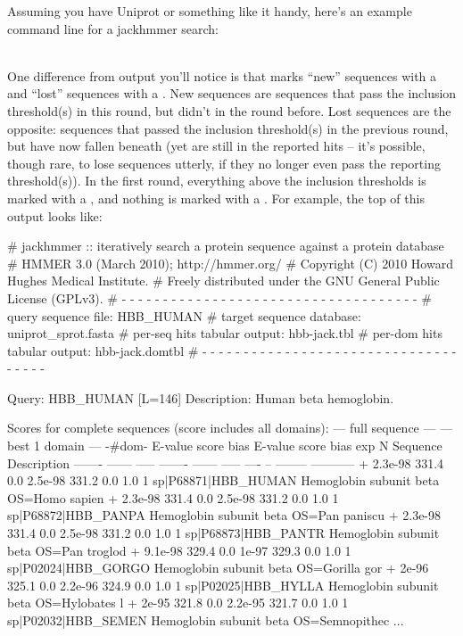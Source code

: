 Assuming you have Uniprot or something like it handy, here's an
example command line for a jackhmmer search:

\\

One difference from  output you'll notice is that
 marks ``new'' sequences with a \ccode{+} and ``lost''
sequences with a \ccode{-}. New sequences are sequences that pass the
inclusion threshold(s) in this round, but didn't in the round before.
Lost sequences are the opposite: sequences that passed the inclusion
threshold(s) in the previous round, but have now fallen beneath (yet
are still in the reported hits -- it's possible, though rare, to lose
sequences utterly, if they no longer even pass the reporting
threshold(s)).  In the first round, everything above the inclusion
thresholds is marked with a \ccode{+}, and nothing is marked with a
\ccode{-}. For example, the top of this output looks like:

\begin{sreoutput}
# jackhmmer :: iteratively search a protein sequence against a protein database
# HMMER 3.0 (March 2010); http://hmmer.org/
# Copyright (C) 2010 Howard Hughes Medical Institute.
# Freely distributed under the GNU General Public License (GPLv3).
# - - - - - - - - - - - - - - - - - - - - - - - - - - - - - - - - - - - -
# query sequence file:             HBB_HUMAN
# target sequence database:        uniprot_sprot.fasta
# per-seq hits tabular output:     hbb-jack.tbl
# per-dom hits tabular output:     hbb-jack.domtbl
# - - - - - - - - - - - - - - - - - - - - - - - - - - - - - - - - - - - -

Query:       HBB_HUMAN  [L=146]
Description: Human beta hemoglobin.

Scores for complete sequences (score includes all domains):
   --- full sequence ---   --- best 1 domain ---    -#dom-
    E-value  score  bias    E-value  score  bias    exp  N  Sequence              Description
    ------- ------ -----    ------- ------ -----   ---- --  --------              -----------
+   2.3e-98  331.4   0.0    2.5e-98  331.2   0.0    1.0  1  sp|P68871|HBB_HUMAN   Hemoglobin subunit beta OS=Homo sapien
+   2.3e-98  331.4   0.0    2.5e-98  331.2   0.0    1.0  1  sp|P68872|HBB_PANPA   Hemoglobin subunit beta OS=Pan paniscu
+   2.3e-98  331.4   0.0    2.5e-98  331.2   0.0    1.0  1  sp|P68873|HBB_PANTR   Hemoglobin subunit beta OS=Pan troglod
+   9.1e-98  329.4   0.0      1e-97  329.3   0.0    1.0  1  sp|P02024|HBB_GORGO   Hemoglobin subunit beta OS=Gorilla gor
+     2e-96  325.1   0.0    2.2e-96  324.9   0.0    1.0  1  sp|P02025|HBB_HYLLA   Hemoglobin subunit beta OS=Hylobates l
+     2e-95  321.8   0.0    2.2e-95  321.7   0.0    1.0  1  sp|P02032|HBB_SEMEN   Hemoglobin subunit beta OS=Semnopithec
...
\end{sreoutput}

